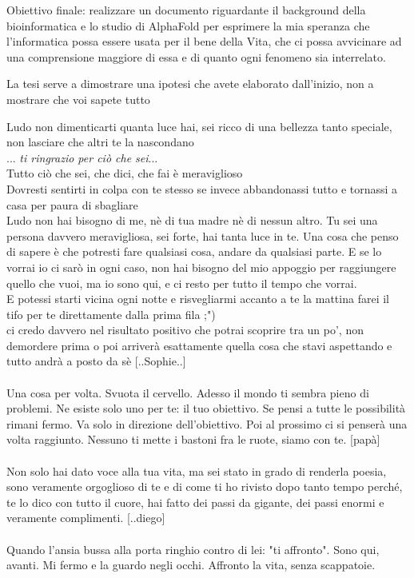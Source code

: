 Obiettivo finale: realizzare un documento riguardante il background della bioinformatica e lo studio di AlphaFold per esprimere la mia speranza che l’informatica possa essere usata per il bene della Vita, che ci possa avvicinare ad una comprensione maggiore di essa e di quanto ogni fenomeno sia interrelato.\newline

La tesi serve a dimostrare una ipotesi che avete elaborato dall’inizio, non a mostrare che voi sapete tutto

Ludo non dimenticarti quanta luce hai, sei ricco di una bellezza tanto speciale, non lasciare che altri te la nascondano\\
... \textit{ti ringrazio per ciò che sei}...\\
Tutto ciò che sei, che dici, che fai è meraviglioso\\
Dovresti sentirti in colpa con te stesso se invece abbandonassi tutto e tornassi a casa per paura di sbagliare\\
Ludo non hai bisogno di me, nè di tua madre nè di nessun altro. Tu sei una persona davvero meravigliosa, sei forte, hai tanta luce in te. Una cosa che penso di sapere è che potresti fare qualsiasi cosa, andare da qualsiasi parte. E se lo vorrai io ci sarò in ogni caso, non hai bisogno del mio appoggio per raggiungere quello che vuoi, ma io sono qui, e ci resto per tutto il tempo che vorrai.\\
E potessi starti vicina ogni notte e risvegliarmi accanto a te la mattina farei il tifo per te direttamente dalla prima fila ;")\\
ci credo davvero nel risultato positivo che potrai scoprire tra un po', non demordere prima o poi arriverà esattamente quella cosa che stavi aspettando e tutto andrà a posto da sè [..Sophie..]\\ \\

Una cosa per volta. Svuota il cervello. Adesso il mondo ti sembra pieno di problemi. Ne esiste solo uno per te: il tuo obiettivo. Se pensi a tutte le possibilità rimani fermo. Va solo in direzione dell'obiettivo. Poi al prossimo ci si penserà una volta raggiunto. Nessuno ti mette i bastoni fra le ruote, siamo con te. [papà] \\ \\


Non solo hai dato voce alla tua vita, ma sei stato in grado di renderla poesia, sono veramente orgoglioso di te e di come ti ho rivisto dopo tanto tempo perché, te lo dico con tutto il cuore, hai fatto dei passi da gigante, dei passi enormi e veramente complimenti. [..diego] \\ \\
Quando l'ansia bussa alla porta ringhio contro di lei: "ti affronto". Sono qui, avanti. Mi fermo e la guardo negli occhi. Affronto la vita, senza scappatoie. \\

